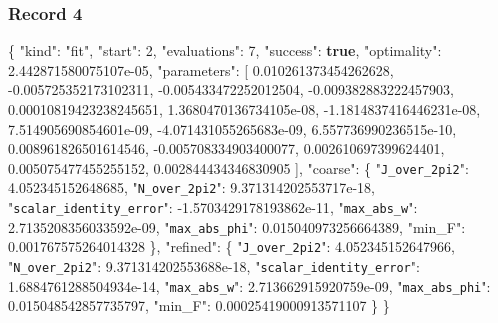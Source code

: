 \documentclass[
  10pt,
]{article}
\newenvironment{Shaded}{}{}
\newcommand{\DataTypeTok}[1]{\textcolor[rgb]{0.56,0.13,0.00}{#1}}
\newcommand{\DecValTok}[1]{\textcolor[rgb]{0.25,0.63,0.44}{#1}}
\newcommand{\FloatTok}[1]{\textcolor[rgb]{0.25,0.63,0.44}{#1}}
\newcommand{\FunctionTok}[1]{\textcolor[rgb]{0.02,0.16,0.49}{#1}}
\newcommand{\KeywordTok}[1]{\textcolor[rgb]{0.00,0.44,0.13}{\textbf{#1}}}
\newcommand{\OtherTok}[1]{\textcolor[rgb]{0.00,0.44,0.13}{#1}}
\newcommand{\StringTok}[1]{\textcolor[rgb]{0.25,0.44,0.63}{#1}}
\begin{document}
\hypertarget{record-4}{%
\subsubsection{Record 4}\label{record-4}}

\begin{Shaded}
\begin{Highlighting}[]
\FunctionTok{\{}
  \DataTypeTok{"kind"}\FunctionTok{:} \StringTok{"fit"}\FunctionTok{,}
  \DataTypeTok{"start"}\FunctionTok{:} \DecValTok{2}\FunctionTok{,}
  \DataTypeTok{"evaluations"}\FunctionTok{:} \DecValTok{7}\FunctionTok{,}
  \DataTypeTok{"success"}\FunctionTok{:} \KeywordTok{true}\FunctionTok{,}
  \DataTypeTok{"optimality"}\FunctionTok{:} \FloatTok{2.442871580075107e{-}05}\FunctionTok{,}
  \DataTypeTok{"parameters"}\FunctionTok{:} \OtherTok{[}
    \FloatTok{0.010261373454262628}\OtherTok{,}
    \FloatTok{{-}0.005725352173102311}\OtherTok{,}
    \FloatTok{{-}0.005433472252012504}\OtherTok{,}
    \FloatTok{{-}0.009382883222457903}\OtherTok{,}
    \FloatTok{0.00010819423238245651}\OtherTok{,}
    \FloatTok{1.3680470136734105e{-}08}\OtherTok{,}
    \FloatTok{{-}1.1814837416446231e{-}08}\OtherTok{,}
    \FloatTok{7.514905690854601e{-}09}\OtherTok{,}
    \FloatTok{{-}4.071431055265683e{-}09}\OtherTok{,}
    \FloatTok{6.557736990236515e{-}10}\OtherTok{,}
    \FloatTok{0.008961826501614546}\OtherTok{,}
    \FloatTok{{-}0.005708334903400077}\OtherTok{,}
    \FloatTok{0.002610697399624401}\OtherTok{,}
    \FloatTok{0.005075477455255152}\OtherTok{,}
    \FloatTok{0.002844434346830905}
  \OtherTok{]}\FunctionTok{,}
  \DataTypeTok{"coarse"}\FunctionTok{:} \FunctionTok{\{}
    \DataTypeTok{"\nolinkurl{J_over_2pi2}"}\FunctionTok{:} \FloatTok{4.052345152648685}\FunctionTok{,}
    \DataTypeTok{"\nolinkurl{N_over_2pi2}"}\FunctionTok{:} \FloatTok{9.371314202553717e{-}18}\FunctionTok{,}
    \DataTypeTok{"\nolinkurl{scalar_identity_error}"}\FunctionTok{:} \FloatTok{{-}1.5703429178193862e{-}11}\FunctionTok{,}
    \DataTypeTok{"\nolinkurl{max_abs_w}"}\FunctionTok{:} \FloatTok{2.7135208356033592e{-}09}\FunctionTok{,}
    \DataTypeTok{"\nolinkurl{max_abs_phi}"}\FunctionTok{:} \FloatTok{0.015040973256664389}\FunctionTok{,}
    \DataTypeTok{"min\_F"}\FunctionTok{:} \FloatTok{0.001767575264014328}
  \FunctionTok{\},}
  \DataTypeTok{"refined"}\FunctionTok{:} \FunctionTok{\{}
    \DataTypeTok{"\nolinkurl{J_over_2pi2}"}\FunctionTok{:} \FloatTok{4.052345152647966}\FunctionTok{,}
    \DataTypeTok{"\nolinkurl{N_over_2pi2}"}\FunctionTok{:} \FloatTok{9.371314202553688e{-}18}\FunctionTok{,}
    \DataTypeTok{"\nolinkurl{scalar_identity_error}"}\FunctionTok{:} \FloatTok{1.6884761288504934e{-}14}\FunctionTok{,}
    \DataTypeTok{"\nolinkurl{max_abs_w}"}\FunctionTok{:} \FloatTok{2.713662915920759e{-}09}\FunctionTok{,}
    \DataTypeTok{"\nolinkurl{max_abs_phi}"}\FunctionTok{:} \FloatTok{0.015048542857735797}\FunctionTok{,}
    \DataTypeTok{"min\_F"}\FunctionTok{:} \FloatTok{0.00025419000913571107}
  \FunctionTok{\}}
\FunctionTok{\}}
\end{Highlighting}
\end{Shaded}
\end{document}
